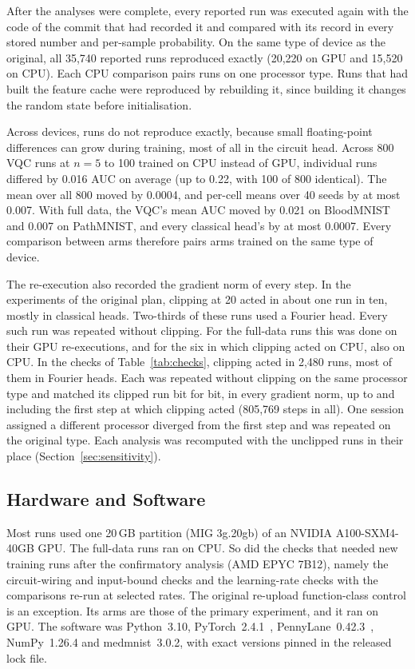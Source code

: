 \documentclass{ieeeaccess}
\newcommand{\vqc}{VQC}
\begin{document}
After the analyses were complete, every reported run was executed again with the code of the commit that had recorded it and compared with its record in every stored number and per-sample probability. On the same type of device as the original, all 35,740 reported runs reproduced exactly (20,220 on GPU and 15,520 on CPU). Each CPU comparison pairs runs on one processor type. Runs that had built the feature cache were reproduced by rebuilding it, since building it changes the random state before initialisation.

Across devices, runs do not reproduce exactly, because small floating-point differences can grow during training, most of all in the circuit head. Across 800 \vqc{} runs at $n=5$ to 100 trained on CPU instead of GPU, individual runs differed by 0.016 AUC on average (up to 0.22, with 100 of 800 identical). The mean over all 800 moved by 0.0004, and per-cell means over 40 seeds by at most 0.007. With full data, the \vqc{}'s mean AUC moved by 0.021 on BloodMNIST and 0.007 on PathMNIST, and every classical head's by at most 0.0007. Every comparison between arms therefore pairs arms trained on the same type of device.

The re-execution also recorded the gradient norm of every step. In the experiments of the original plan, clipping at 20 acted in about one run in ten, mostly in classical heads. Two-thirds of these runs used a Fourier head. Every such run was repeated without clipping. For the full-data runs this was done on their GPU re-executions, and for the six in which clipping acted on CPU, also on CPU. In the checks of Table~\ref{tab:checks}, clipping acted in 2,480 runs, most of them in Fourier heads. Each was repeated without clipping on the same processor type and matched its clipped run bit for bit, in every gradient norm, up to and including the first step at which clipping acted (805,769 steps in all). One session assigned a different processor diverged from the first step and was repeated on the original type. Each analysis was recomputed with the unclipped runs in their place (Section~\ref{sec:sensitivity}).

\subsection{Hardware and Software}
Most runs used one 20\,GB partition (MIG 3g.20gb) of an NVIDIA A100-SXM4-40GB GPU. The full-data runs ran on CPU. So did the checks that needed new training runs after the confirmatory analysis (AMD EPYC 7B12), namely the circuit-wiring and input-bound checks and the learning-rate checks with the comparisons re-run at selected rates. The original re-upload function-class control is an exception. Its arms are those of the primary experiment, and it ran on GPU. The software was Python~3.10, PyTorch~2.4.1~\cite{paszke2019}, PennyLane~0.42.3~\cite{bergholm2018}, NumPy~1.26.4 and medmnist~3.0.2, with exact versions pinned in the released lock file.
\end{document}
